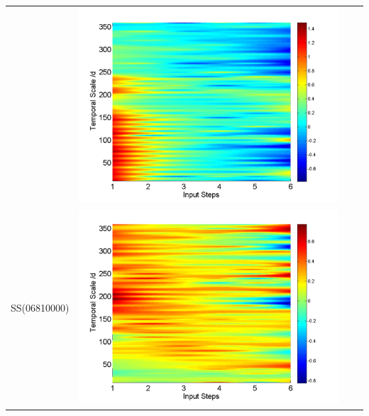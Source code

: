 \documentclass[review]{elsarticle}
\begin{document}
\begin{table}[H]
\begin{tabular}{cccc}
&\begin{minipage}{.3\textwidth}\includegraphics[width=\linewidth]{resultgraph/11532500qdiff_former.png}\end{minipage}
\\
SS(06810000)
&\begin{minipage}{.3\textwidth}\includegraphics[width=\linewidth]{resultgraph/06810000pdiff_former.png}\end{minipage}

\end{tabular}
\end{table}
\end{document}
